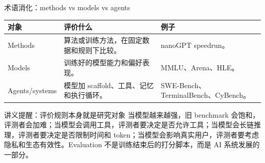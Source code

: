 \begin{knowledgebox}{术语消化：methods vs models vs agents}
\begin{tabular}{L{0.2\textwidth}L{0.36\textwidth}L{0.34\textwidth}}
\toprule
对象 & 评价什么 & 例子 \\
\midrule
Methods & 算法或训练方法，在固定数据和规则下比较。 & nanoGPT speedrun。 \\
Models & 训练好的模型能力和偏好表现。 & MMLU、Arena、HLE。 \\
Agents/systems & 模型加 scaffold、工具、记忆和执行循环。 & SWE-Bench、TerminalBench、CyBench。 \\
\bottomrule
\end{tabular}
\end{knowledgebox}

\begin{importantbox}{讲义提醒：评价规则本身就是研究对象}
当模型越来越强，旧 benchmark 会饱和，评测者会加难；当模型会调用工具，评测者要决定是否允许工具；当模型会长链推理，评测者要决定是否限制时间和 token；当模型会影响真实用户，评测者要考虑隐私和生态有效性。Evaluation 不是训练结束后的打分脚本，而是 AI 系统发展的一部分。
\end{importantbox}

